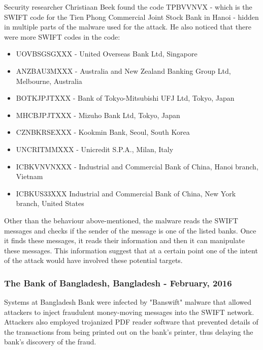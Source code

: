 \documentclass[12pt]{article}
\begin{document}
        Security researcher Christiaan Beek found the code TPBVVNVX - which is the SWIFT code for the Tien Phong Commercial Joint Stock Bank in Hanoi - hidden in multiple parts of the malware used for the attack.
        He also noticed that there were more SWIFT codes in the code:
        \begin{itemize}
            \item UOVBSGSGXXX - United Overseas Bank Ltd, Singapore
            \item ANZBAU3MXXX - Australia and New Zealand Banking Group Ltd, Melbourne, Australia
            \item BOTKJPJTXXX - Bank of Tokyo-Mitsubishi UFJ Ltd, Tokyo, Japan
            \item MHCBJPJTXXX - Mizuho Bank Ltd, Tokyo, Japan
            \item CZNBKRSEXXX - Kookmin Bank, Seoul, South Korea
            \item UNCRITMMXXX - Unicredit S.P.A., Milan, Italy
            \item ICBKVNVNXXX - Industrial and Commercial Bank of China, Hanoi branch, Vietnam
            \item ICBKUS33XXX Industrial and Commercial Bank of China, New York branch, United States
        \end{itemize}
       
         Other than the behaviour above-mentioned, the malware reads the SWIFT messages and checks if the sender of the message is one of the listed banks. Once it finds these messages, it reads their information and then it can manipulate these messages. This information suggest that at a certain point one of the intent of the attack would have involved these potential targets.\cite{AttacksSWIFTBanking2016}
        
    \subsubsection{The Bank of Bangladesh, Bangladesh - February, 2016}
        
        Systems at Bangladesh Bank were infected by "Banswift" malware that allowed attackers to inject fraudulent money-moving messages into the SWIFT network. Attackers also employed trojanized PDF reader software that prevented details of the transactions from being printed out on the bank's printer, thus delaying the bank's discovery of the fraud.
        
\end{document}
